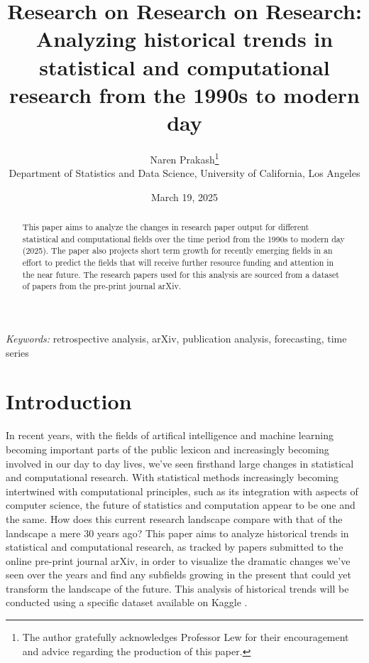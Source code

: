 \documentclass[
  12pt]{article}
\begin{document}
\def\spacingset#1{\renewcommand{\baselinestretch}%
{#1}\small\normalsize} \spacingset{1}



\date{March 19, 2025}
\title{\bf Research on Research on Research: Analyzing historical trends
in statistical and computational research from the 1990s to modern day}
\author{
Naren Prakash\thanks{The author gratefully acknowledges Professor Lew
for their encouragement and advice regarding the production of this
paper.}\\
Department of Statistics and Data Science, University of California, Los
Angeles\\
}
\maketitle

\bigskip
\bigskip
\begin{abstract}
This paper aims to analyze the changes in research paper output for
different statistical and computational fields over the time period from
the 1990s to modern day (2025). The paper also projects short term
growth for recently emerging fields in an effort to predict the fields
that will receive further resource funding and attention in the near
future. The research papers used for this analysis are sourced from a
dataset of papers from the pre-print journal arXiv.
\end{abstract}

\noindent%
{\it Keywords:} retrospective analysis, arXiv, publication analysis,
forecasting, time series
\vfill

\newpage
\spacingset{1.9} %


\section{Introduction}\label{sec-intro}

In recent years, with the fields of artifical intelligence and machine
learning becoming important parts of the public lexicon and increasingly
becoming involved in our day to day lives, we've seen firsthand large
changes in statistical and computational research. With statistical
methods increasingly becoming intertwined with computational principles,
such as its integration with aspects of computer science, the future of
statistics and computation appear to be one and the same. How does this
current research landscape compare with that of the landscape a mere 30
years ago? This paper aims to analyze historical trends in statistical
and computational research, as tracked by papers submitted to the online
pre-print journal arXiv, in order to visualize the dramatic changes
we've seen over the years and find any subfields growing in the present
that could yet transform the landscape of the future. This analysis of
historical trends will be conducted using a specific dataset available
on Kaggle \citet{arXiv:kaggle:data}.
\end{document}
